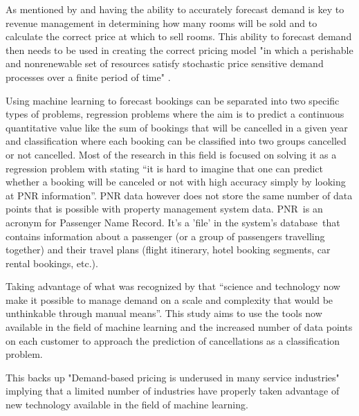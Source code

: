 \vspace{5mm}

As mentioned by \cite{RevenueWorldCat.org} and \cite{Weatherford2003AManagement} having the ability to accurately forecast demand is key to revenue management in determining how many rooms will be sold and to calculate the correct price at which to sell rooms. This ability to forecast demand then needs to be used in creating the correct pricing model "in which a perishable and nonrenewable set of resources satisfy stochastic price sensitive demand processes over a finite period of time" \cite{Bitran2003AnManagement}.

\vspace{5mm}

Using machine learning to forecast bookings can be separated into two specific types of problems, regression problems where the aim is to predict a continuous quantitative value like the sum of bookings that will be cancelled in a given year and classification where each booking can be classified into two groups cancelled or not cancelled. Most of the research in this field is focused on solving it as a regression problem with  \cite{RomeroMorales2010ForecastingMining} stating “it is hard to imagine that one can predict whether a booking will be canceled or not with high accuracy simply by looking at PNR information”. PNR data however does not store the same number of data points that is possible with property management system data. PNR is an acronym for Passenger Name Record. It's a 'file' in the system's database that contains information about a passenger (or a group of passengers travelling together) and their travel plans (flight itinerary, hotel booking segments, car rental bookings, etc.).

\vspace{5mm}

Taking advantage of what was recognized by \cite{Talluri2004TheManagement} that “science and technology now make it possible to manage demand on a scale and complexity that would be unthinkable through manual means”.  This study aims to use the tools now available in the field of machine learning and the increased number of data points on each customer to approach the prediction of cancellations as a classification problem.   

This backs up "Demand-based pricing is underused in many service industries" \cite{Kimes2003HasAcceptable} implying that a limited number of industries have properly taken advantage of new technology available in the field of machine learning.

